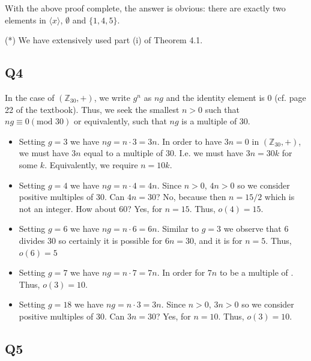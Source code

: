 \documentclass[12pt]{article}
\def\Z{{\mathbb Z}}        %
\numberwithin{theorem}{section}
\numberwithin{equation}{section}
\numberwithin{remark}{section}
\numberwithin{definition}{section}
\numberwithin{theorem}{section}
\numberwithin{lemma}{section}
\numberwithin{example}{section}
\begin{document}
With the above proof complete, the answer is obvious: there are exactly two elements in $\langle x \rangle$, $\emptyset$ and $\{1,4,5\}$. 

\vspace{\baselineskip}

\noindent (*) We have extensively used part (i) of Theorem 4.1.



\subsection{Q4}

In the case of $(\Z_{30},+)$, we write $g^n$ as $ng$ and the identity element is $0$ (cf. page 22 of the textbook). Thus, we seek the smallest $n>0$ such that $ng\equiv0(\text{mod }{30})$ or equivalently, such that $ng$ is a multiple of 30.
\begin{itemize}
	\item{Setting $g=3$ we have $ng=n\cdot3=3n$. In order to have $3n=0$ in $(\Z_{30},+)$, we must have $3n$ equal to a multiple of $30$. I.e. we must have $3n=30k$ for some $k$. Equivalently, we require $n=10k$.}
	\item{Setting $g=4$ we have $ng=n\cdot4=4n$. Since $n>0$, $4n>0$ so we consider positive multiples of 30. Can $4n=30$? No, because then $n=15/2$ which is not an integer. How about 60? Yes, for $n=15$. Thus, $o(4)=15$.}
	\item{Setting $g=6$ we have $ng=n\cdot6=6n$. Similar to $g=3$ we observe that 6 divides 30 so certainly it is possible for $6n=30$, and it is for $n=5$. Thus, $o(6)=5$}
	\item{Setting $g=7$ we have $ng=n\cdot7=7n$. In order for $7n$ to be a multiple of . Thus, $o(3)=10$.}
	\item{Setting $g=18$ we have $ng=n\cdot3=3n$. Since $n>0$, $3n>0$ so we consider positive multiples of 30. Can $3n=30$? Yes, for $n=10$. Thus, $o(3)=10$.}
\end{itemize}



\subsection{Q5}
\end{document}
